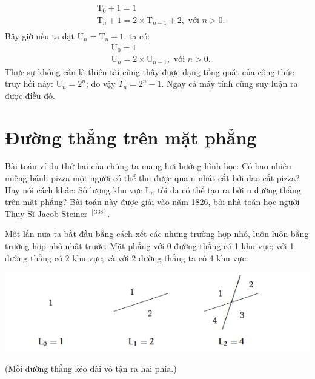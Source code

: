 \begin{equation*}
    \begin{aligned}
        & \mathrm{T}_0 + 1 = 1 \\
        & \mathrm{T}_n + 1 = 2 \times \mathrm{T}_{n - 1} + 2, \text{ \ \ \ \ với } n > 0. \\ 
    \end{aligned}
\end{equation*}
Bây giờ nếu ta đặt $\mathrm{U}_n = \mathrm{T}_n + 1$, ta có:
\begin{equation}\label{eq:1.3}
    \begin{aligned}
        & \mathrm{U}_0 = 1 \\
        & \mathrm{U}_n = 2 \times \mathrm{U}_{n - 1}, \text{ \ \ \ \ với } n > 0.
    \end{aligned}
\end{equation}
Thực sự không cần là thiên tài cũng thấy được dạng tổng quát của công thức truy hồi này: $\mathrm{U}_n = 2^n$; do vậy $T_n = 2^n - 1$. Ngay cả máy tính cũng suy luận ra được điều đó.

\section{Đường thẳng trên mặt phẳng}\label{sec:1.2}

Bài toán ví dụ thứ hai của chúng ta mang hơi hướng hình học: Có bao nhiêu miếng bánh pizza một người có thể thu được qua n nhát cắt bởi dao cắt pizza? Hay nói cách khác: Số lượng khu vực $\mathrm{L}_n$ tối đa có thể tạo ra bởi n đường thẳng trên mặt phẳng? 
Bài toán này được giải vào năm 1826, bởi nhà toán học người Thụy Sĩ Jacob Steiner \href{J. Steiner, Einige Gesetze uber die Theilung der Ebene und des 5, 633. Raumes," Journal fur die reine und angewandte Mathematik 1 (1826), 349-364. Reprinted in his Gesammelte Werke, volume 1, 77-94}{$^{[338]}$}.

Một lần nữa ta bắt đầu bằng cách xét các những trường hợp nhỏ, luôn luôn bằng trường hợp nhỏ nhất trước. Mặt phẳng với 0 đường thẳng có 1 khu vực; với 1 đường thẳng có 2 khu vực; và với 2 đường thẳng ta có 4 khu vực:
\begin{center}
    \includegraphics[width=1\textwidth]{assets/chapter1/Line Sequence.png}
\end{center}
(Mỗi đường thẳng kéo dài vô tận ra hai phía.)


